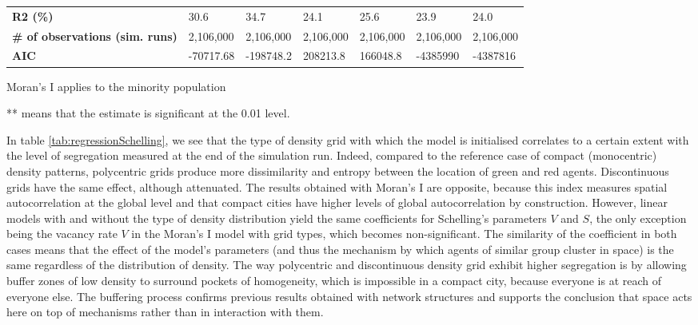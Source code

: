 \documentclass{JASSS}
\begin{document}
\begin{table}[]
\begin{threeparttable}
\begin{tabular}{|p{2.5cm}|ll|ll|ll|}
\textbf{R2 (\%)}                            & 30.6       & 34.7                             & 24.1              & 25.6              & 23.9                 & 24.0                    \\ 
\textbf{\# of observations (sim. runs)}     & 2,106,000  & 2,106,000 						 & 2,106,000          & 2,106,000          & 2,106,000             & 2,106,000                \\ 
\textbf{AIC}                                & -70717.68   & -198748.2  						& 208213.8          & 166048.8          & -4385990             & -4387816                 \\ \hline
\end{tabular}
\begin{tablenotes}
 \item Moran's I applies to the minority population
 \item *** means that the estimate is significant at the 0.01 level.
\end{tablenotes}
  \end{threeparttable}
\end{table}

In table \ref{tab:regressionSchelling}, we see that the type of density grid with which the model is initialised correlates to a certain extent with the level of segregation measured at the end of the simulation run. Indeed, compared to the reference case of compact (monocentric) density patterns, polycentric grids produce more dissimilarity and entropy between the location of green and red agents. Discontinuous grids have the same effect, although attenuated. The results obtained with Moran's I are opposite, because this index measures spatial autocorrelation at the global level and that compact cities have higher levels of global autocorrelation by construction. However, linear models with and without the type of density distribution yield the same coefficients for Schelling's parameters $V$ and $S$, the only exception being the vacancy rate $V$ in the Moran's I model with grid types, which becomes non-significant. The similarity of the coefficient in both cases means that the effect of the model's parameters (and thus the mechanism by which agents of similar group cluster in space) is the same regardless of the distribution of density. The way polycentric and discontinuous density grid exhibit higher segregation is by allowing buffer zones of low density to surround pockets of homogeneity, which is impossible in a compact city, because everyone is at reach of everyone else. The buffering process confirms previous results obtained with network structures \citep{Banos2012} and supports the conclusion that space acts here on top of mechanisms rather than in interaction with them.
\end{document}
